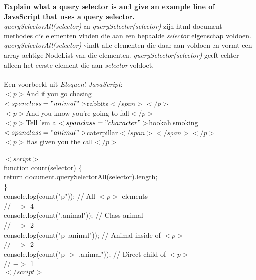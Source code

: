 \documentclass[10pt,a4paper]{article}
\begin{document}
\noindent
\textbf{Explain what a query selector is and give an example line of JavaScript that uses a query selector.}\\

\noindent
\textit{querySelectorAll(selector)} en \textit{querySelector(selector)} zijn html document methodes die elementen vinden die aan een bepaalde \textit{selector} eigenschap voldoen. \textit{querySelectorAll(selector)} vindt alle elementen die daar aan voldoen en vormt een array-achtige NodeList van die elementen. \textit{querySelector(selector)} geeft echter alleen het eerste element die aan \textit{selector} voldoet.\\
\\ 
\noindent
Een voorbeeld uit \textit{Eloquent JavaScript}:\\
$<p>$And if you go chasing\\
$<span class="animal">$rabbits$</span></p>$\\
$<p>$And you know you're going to fall$</p>$\\
$<p>$Tell 'em a $<span class="character">$hookah smoking\\
$<span class="animal">$caterpillar$</span></span></p>$\\
$<p>$Has given you the call$</p>$\\
\\
\noindent
$<script>$\\
function count(selector) \{\\
return document.querySelectorAll(selector).length;\\
\}\\
console.log(count("p"));           // All $<p>$ elements\\
// $->$ 4\\
console.log(count(".animal"));     // Class animal\\
// $->$ 2\\
console.log(count("p .animal"));   // Animal inside of $<p>$\\
// $->$ 2\\
console.log(count("p $>$ .animal")); // Direct child of $<p>$\\
// $->$ 1\\
$</script>$\\
\end{document}
